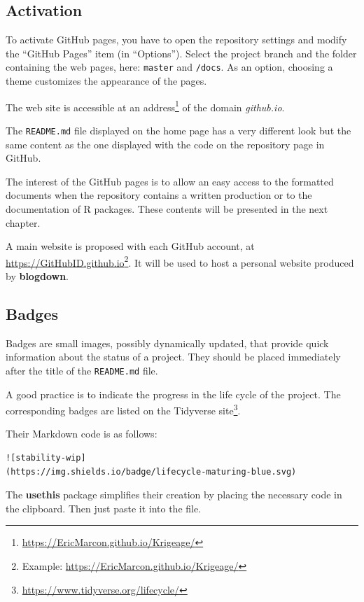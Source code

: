 \documentclass[
  12pt,
  american,
  a4paper,
  extrafontsizes,onecolumn,openright
  ]{memoir}
\begin{document}
\hypertarget{activation}{%
\subsection{Activation}\label{activation}}

To activate GitHub pages, you have to open the repository settings and modify the \enquote{GitHub Pages} item (in \enquote{Options}).
Select the project branch and the folder containing the web pages, here: \texttt{master} and \texttt{/docs}.
As an option, choosing a theme customizes the appearance of the pages.

The web site is accessible at an address\footnote{\url{https://EricMarcon.github.io/Krigeage/}} of the domain \emph{github.io}.

The \texttt{README.md} file displayed on the home page has a very different look but the same content as the one displayed with the code on the repository page in GitHub.

The interest of the GitHub pages is to allow an easy access to the formatted documents when the repository contains a written production or to the documentation of R packages.
These contents will be presented in the next chapter.

A main website is proposed with each GitHub account, at \url{https://GitHubID.github.io}\footnote{Example: \url{https://EricMarcon.github.io/Krigeage/}}.
It will be used to host a personal website produced by \textbf{blogdown}.

\hypertarget{badges}{%
\subsection{Badges}\label{badges}}

Badges are small images, possibly dynamically updated, that provide quick information about the status of a project.
They should be placed immediately after the title of the \texttt{README.md} file.

A good practice is to indicate the progress in the life cycle of the project.
The corresponding badges are listed on the Tidyverse site\footnote{\url{https://www.tidyverse.org/lifecycle/}}.

Their Markdown code is as follows:

\begin{verbatim}
![stability-wip]
(https://img.shields.io/badge/lifecycle-maturing-blue.svg)
\end{verbatim}

The \textbf{usethis} package simplifies their creation by placing the necessary code in the clipboard.
Then just paste it into the file.
\end{document}

